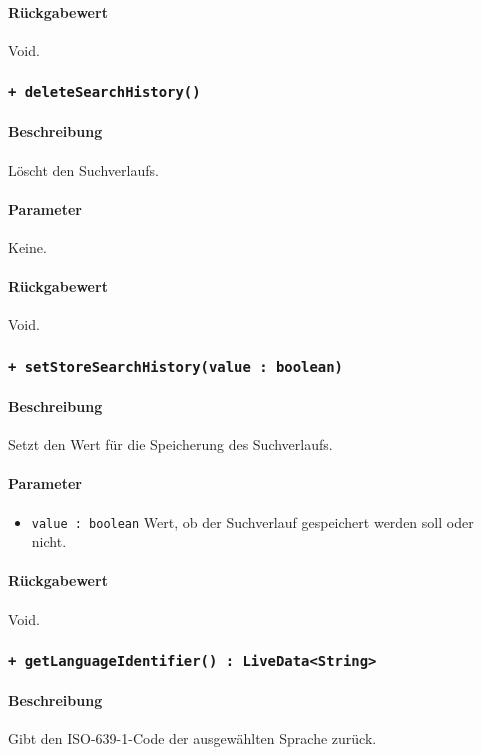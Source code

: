 \paragraph*{Rückgabewert}
Void.

\subsubsection*{\texttt{+ deleteSearchHistory()}}%
\paragraph*{Beschreibung}
Löscht den Suchverlaufs.
\paragraph*{Parameter}
Keine.
\paragraph*{Rückgabewert}
Void.

\subsubsection*{\texttt{+ setStoreSearchHistory(value : boolean)}}%
\paragraph*{Beschreibung}
Setzt den Wert für die Speicherung des Suchverlaufs.
\paragraph*{Parameter}
\begin{itemize}
    \item \texttt{value : boolean} Wert, ob der Suchverlauf gespeichert werden soll oder nicht.
\end{itemize}
\paragraph*{Rückgabewert}
Void.

\subsubsection*{\texttt{+ getLanguageIdentifier() : LiveData<String>}}%
\paragraph*{Beschreibung}
Gibt den ISO-639-1-Code der ausgewählten Sprache zurück.
